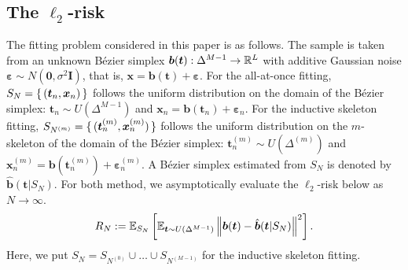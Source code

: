 \documentclass{article}
\begin{document}
\subsection{The \texorpdfstring{$\ell_2$}{l2}-risk}
The fitting problem considered in this paper is as follows.
The sample is taken from an unknown B\'ezier simplex $\bm b(\bm t): \Delta^{M-1} \to \mathbb{R}^L$ with additive Gaussian noise $\bm \varepsilon \sim N(\bm 0, \sigma^2 \bm I)$, that is, $\bm x = \bm b(\bm t) + \bm \varepsilon$.
For the all-at-once fitting, $S_N = \set{(\bm t_n, \bm x_n)}$ follows the uniform distribution on the domain of the B\'ezier simplex: $\bm t_n \sim U(\Delta^{M-1})$ and $\bm x_n = \bm b(\bm t_n) + \bm \varepsilon_n$.
For the inductive skeleton fitting, $S_{N^{(m)}} = \set{(\bm t_n^{(m)}, \bm x_n^{(m)})}$ follows the uniform distribution on the $m$-skeleton of the domain of the B\'ezier simplex: $\bm t_n^{(m)} \sim U(\Delta^{(m)})$ and $\bm x_n^{(m)} = \bm b(\bm t_n^{(m)}) + \bm \varepsilon_n^{(m)}$.
A B\'ezier simplex estimated from $S_N$ is denoted by $\bm{\hat b}(\bm t | S_N)$.
For both method, we asymptotically evaluate the $\ell_2$-risk below as $N \to \infty$.
\begin{equation}\label{eqn:risk-def}
R_N := \mathbb{E}_{S_N}\left[\mathbb{E}_{\bm t \sim U(\Delta^{M-1})} \left\| \bm b(\bm t) - \hat{\bm b}(\bm t | S_N) \right\|^2 \right].
\end{equation}
Here, we put $S_N = S_{N^{(0)}} \cup \dots \cup S_{N^{(M-1)}}$ for the inductive skeleton fitting.

\end{document}
